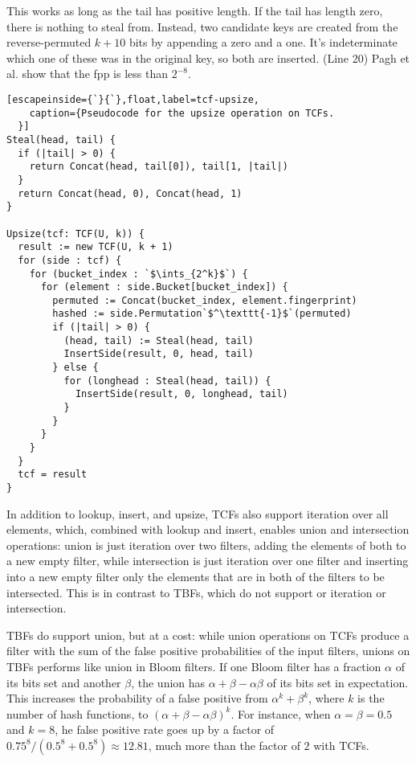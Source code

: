 \documentclass[sigconf, nonacm]{acmart}
\newcommand{\ints}{\mathbb{Z}}
\newcommand{\etal}{et al.}
\begin{document}
This works as long as the tail has positive length.
If the tail has length zero, there is nothing to steal from.
Instead, two candidate keys are created from the reverse-permuted $k+10$ bits by appending a zero and a one.
It's indeterminate which one of these was in the original key, so both are inserted. (Line 20)
Pagh \etal{} show that the fpp is less than $2^{-8}$.~\cite{psw}

\begin{lstlisting}[escapeinside={`}{`},float,label=tcf-upsize,
    caption={Pseudocode for the upsize operation on TCFs.
  }]
Steal(head, tail) {
  if (|tail| > 0) {
    return Concat(head, tail[0]), tail[1, |tail|)
  }
  return Concat(head, 0), Concat(head, 1)
}

Upsize(tcf: TCF(U, k)) {
  result := new TCF(U, k + 1)
  for (side : tcf) {
    for (bucket_index : `$\ints_{2^k}$`) {
      for (element : side.Bucket[bucket_index]) {
        permuted := Concat(bucket_index, element.fingerprint)
        hashed := side.Permutation`$^\texttt{-1}$`(permuted)
        if (|tail| > 0) {
          (head, tail) := Steal(head, tail)
          InsertSide(result, 0, head, tail)
        } else {
          for (longhead : Steal(head, tail)) {
            InsertSide(result, 0, longhead, tail)
          }
        }
      }
    }
  }
  tcf = result
}
\end{lstlisting}

In addition to lookup, insert, and upsize, TCFs also support iteration over all elements, which, combined with lookup and insert, enables union and intersection operations: union is just iteration over two filters, adding the elements of both to a new empty filter, while intersection is just iteration over one filter and inserting into a new empty filter only the elements that are in both of the filters to be intersected.
This is in contrast to TBFs, which do not support or iteration or intersection.

TBFs do support union, but at a cost: while union operations on TCFs produce a filter with the sum of the false positive probabilities of the input filters, unions on TBFs performs like union in Bloom filters.
If one Bloom filter has a fraction $\alpha$ of its bits set and another $\beta$, the union has $\alpha + \beta - \alpha \beta$ of its bits set in expectation.
This increases the probability of a false positive from $\alpha^k + \beta^k$, where $k$ is the number of hash functions, to $(\alpha + \beta - \alpha \beta)^k$.
For instance, when $\alpha = \beta = 0.5$ and $k = 8$, he false positive rate goes up by a factor of $0.75^8/(0.5^8 + 0.5^8) \approx 12.81$, much more than the factor of $2$ with TCFs.
\end{document}
